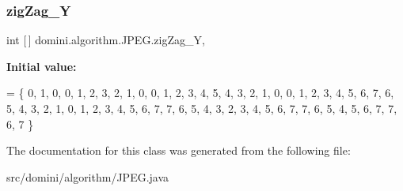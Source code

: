 \subsubsection{\texorpdfstring{zig\+Zag\+\_\+Y}{zigZag\_Y}}
{\footnotesize\ttfamily int \mbox{[}$\,$\mbox{]} domini.\+algorithm.\+J\+P\+E\+G.\+zig\+Zag\+\_\+Y\hspace{0.3cm}{\ttfamily [static]}, {\ttfamily [private]}}

{\bfseries Initial value\+:}
\begin{DoxyCode}
= \{
        0,
        1, 0,
        0, 1, 2,
        3, 2, 1, 0,
        0, 1, 2, 3, 4,
        5, 4, 3, 2, 1, 0,
        0, 1, 2, 3, 4, 5, 6,
        7, 6, 5, 4, 3, 2, 1, 0,
        1, 2, 3, 4, 5, 6, 7,
        7, 6, 5, 4, 3, 2,
        3, 4, 5, 6, 7,
        7, 6, 5, 4,
        5, 6, 7,
        7, 6,
        7
    \}
\end{DoxyCode}


The documentation for this class was generated from the following file\+:\begin{DoxyCompactItemize}
\item 
src/domini/algorithm/J\+P\+E\+G.\+java\end{DoxyCompactItemize}
